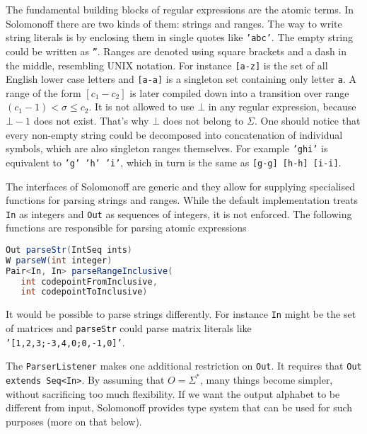 \documentclass[12pt]{article}
\begin{document}
 The fundamental building blocks of regular expressions are the atomic terms. In Solomonoff there are two kinds of them: strings and ranges. The way to write string literals is by enclosing them in single quotes like \texttt{'abc'}. The empty string could be written as  \texttt{''}. Ranges are denoted using square brackets and a dash in the middle, resembling UNIX notation. For instance \texttt{[a-z]} is the set of all English lower case letters and \texttt{[a-a]} is a singleton set containing only letter \texttt{a}. A range of the form $[c_1-c_2]$ is later compiled down into a transition over range $(c_1-1)<\sigma\le c_2$. It is not allowed to use $\bot$ in any regular expression, because $\bot-1$ does not exist. That's why $\bot$ does not belong to $\Sigma$. One should notice that every non-empty string could be decomposed into concatenation of individual symbols, which are also singleton ranges themselves. For example \texttt{'ghi'} is equivalent to \texttt{'g' 'h' 'i'}, which in turn is the same as \texttt{[g-g] [h-h] [i-i]}. 
 
 The interfaces of Solomonoff are generic and they allow for supplying specialised functions for parsing strings and ranges. While the default implementation treats \texttt{In} as integers and \texttt{Out} as sequences of integers, it is not enforced.
The following functions are responsible for parsing atomic expressions
\begin{lstlisting}[language=java]
Out parseStr(IntSeq ints)
W parseW(int integer)
Pair<In, In> parseRangeInclusive(
   int codepointFromInclusive, 
   int codepointToInclusive)
\end{lstlisting}
It would be possible to parse strings differently. For instance \texttt{In} might be the set of matrices and \texttt{parseStr} could parse matrix literals like\\
 \texttt{'[1,2,3;-3,4,0;0,-1,0]'}.

The \texttt{ParserListener} makes one additional restriction on \texttt{Out}. It requires that \texttt{Out extends Seq<In>}. By assuming that $O=\Sigma^*$, many things become simpler, without sacrificing too much flexibility. If we want the output alphabet to be different from input, Solomonoff provides type system that can be used for such purposes (more on that below). 
\end{document}
